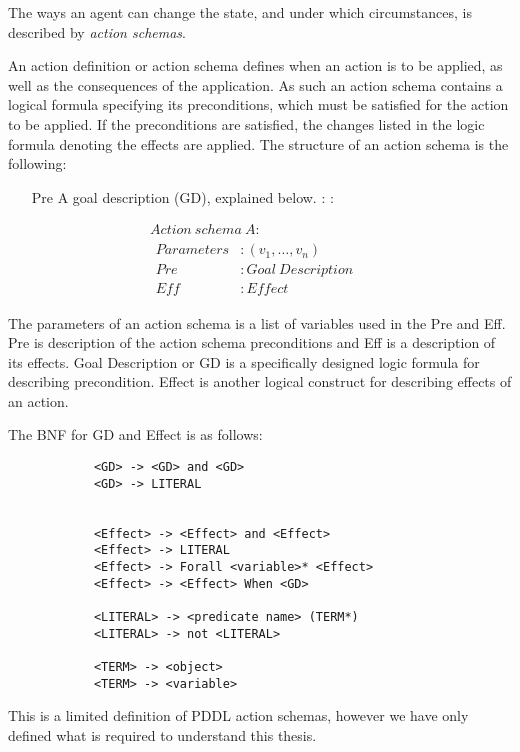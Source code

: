 \documentclass[../Master.tex]{subfiles}
\begin{document}
The ways an agent can change the state, and under which circumstances, is described by \textit{action schemas}. 
	
\begin{definition} \label{def:lrn:action-spec-def}
		An action definition or action schema defines when an action is to be applied, as well as the consequences of the application. As such an action schema contains a logical formula specifying its preconditions, which must be satisfied for the action to be applied. If the preconditions are satisfied, the changes listed in the logic formula denoting the effects are applied. The structure of an action schema is the following:
	\begin{itemize}
        \item[Pre] A goal description (GD), explained below. : :
    \end{itemize}
    \begin{equation*}
		\begin{array}{ll}
		Action~schema~A: & \\
		
		\begin{array}{ll}
		Parameters & : (v_1,\dots,v_n) \\  
		Pre	& : Goal~Description \\
		Eff & : Effect 
		\end{array}
		\end{array}
    \end{equation*}

	The parameters of an action schema is a list of variables used in the Pre and Eff. Pre is description of the action schema preconditions and Eff is a description of its effects. 
    Goal Description or GD is a specifically designed logic formula for describing precondition. Effect is another logical construct for describing effects of an action.

		The BNF for GD and Effect is as follows:
		
		\begin{lstlisting}
            <GD> -> <GD> and <GD>
            <GD> -> LITERAL
            
            
            <Effect> -> <Effect> and <Effect>
            <Effect> -> LITERAL
            <Effect> -> Forall <variable>* <Effect> 
            <Effect> -> <Effect> When <GD>
            
            <LITERAL> -> <predicate name> (TERM*)
            <LITERAL> -> not <LITERAL>
            
            <TERM> -> <object>
            <TERM> -> <variable>
		\end{lstlisting}
		
		This is a limited definition of PDDL action schemas, however we have only defined what is required to understand this thesis.
	\end{definition}
	
\end{document}

